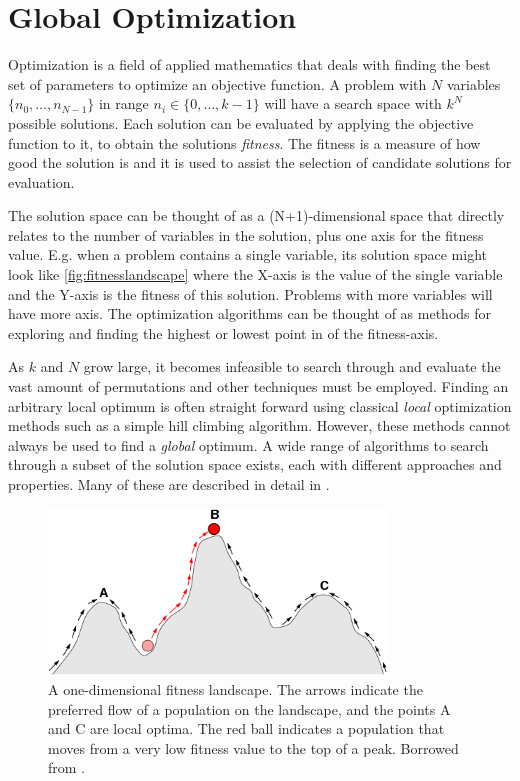 \section{Global Optimization}

Optimization is a field of applied mathematics that deals with finding the best
set of parameters to optimize an objective function. A problem with $N$
variables $\{n_0, \dots, n_{N-1}\}$ in range $n_i \in \{0, \dots, k-1\}$ will
have a search space with $k^N$ possible solutions. Each solution can be
evaluated by applying the objective function to it, to obtain the solutions
\emph{fitness}. The fitness is a measure of how good the solution is and it is
used to assist the selection of candidate solutions for evaluation.

The solution space can be thought of as a (N+1)-dimensional space that directly
relates to the number of variables in the solution, plus one axis for the
fitness value. E.g. when a problem contains a single variable, its solution
space might look like \autoref{fig:fitnesslandscape} where the X-axis is the
value of the single variable and the Y-axis is the fitness of this solution.
Problems with more variables will have more axis. The optimization algorithms
can be thought of as methods for exploring and finding the highest or lowest
point in of the fitness-axis.

As $k$ and $N$ grow large, it becomes infeasible to search through and
evaluate the vast amount of permutations and other techniques must be employed.
Finding an arbitrary local optimum is often straight forward using classical
\emph{local} optimization methods such as a simple hill climbing algorithm.
However, these methods cannot always be used to find a \emph{global} optimum. A wide
range of algorithms to search through a subset of the solution space exists,
each with different approaches and properties. Many of these are described in
detail in \cite{russellnorvig}.

\begin{figure}[bth]
    \centering
    \includegraphics[width=0.8\textwidth]{figs/Fitness-landscape-cartoon.png}
    \caption{A one-dimensional fitness landscape. The arrows indicate the
        preferred flow of a population on the landscape, and the points A and C
        are local optima. The red ball indicates a population that moves from a
        very low fitness value to the top of a peak. Borrowed from \cite{wikifitnesslandscape}.}
    \label{fig:fitnesslandscape}
\end{figure}

